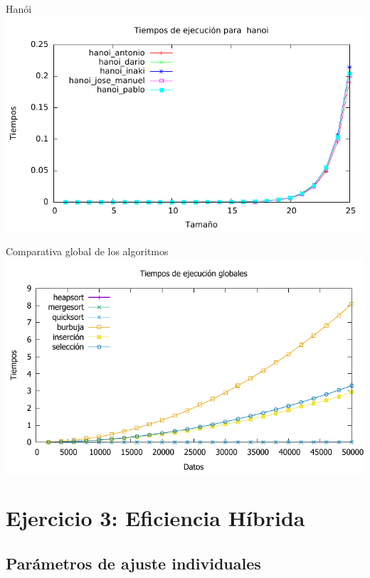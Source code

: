 \documentclass[10pt,compress,usetitleprogressbar,mathserif]{beamer}
\begin{document}
\begin{frame}{Hanói}
		\includegraphics[width = \textwidth ]{hanoi_todos_g}
\end{frame}

\begin{frame}{Comparativa global de los algoritmos}
		\includegraphics[width = \textwidth ]{comparativa_global_g}
\end{frame}


\section{Ejercicio 3: \large{Eficiencia Híbrida }}

\subsection{Parámetros de ajuste individuales}
\end{document}
